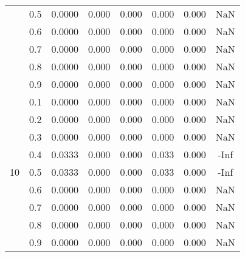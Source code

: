 \documentclass[11pt,a4paper]{report}
\begin{document}
\begin{longtable}{ | c | c || c | c | c | c | c | c | }
 & 0.5 & 0.0000 & 0.000 & 0.000 & 0.000 & 0.000 & NaN \\
 & 0.6 & 0.0000 & 0.000 & 0.000 & 0.000 & 0.000 & NaN \\
 & 0.7 & 0.0000 & 0.000 & 0.000 & 0.000 & 0.000 & NaN \\
 & 0.8 & 0.0000 & 0.000 & 0.000 & 0.000 & 0.000 & NaN \\
 & 0.9 & 0.0000 & 0.000 & 0.000 & 0.000 & 0.000 & NaN \\
 \hline
\multirow{9}{*}{10} & 0.1 & 0.0000 & 0.000 & 0.000 & 0.000 & 0.000 & NaN \\
 & 0.2 & 0.0000 & 0.000 & 0.000 & 0.000 & 0.000 & NaN \\
 & 0.3 & 0.0000 & 0.000 & 0.000 & 0.000 & 0.000 & NaN \\
 & 0.4 & 0.0333 & 0.000 & 0.000 & 0.033 & 0.000 & -Inf \\
 & 0.5 & 0.0333 & 0.000 & 0.000 & 0.033 & 0.000 & -Inf \\
 & 0.6 & 0.0000 & 0.000 & 0.000 & 0.000 & 0.000 & NaN \\
 & 0.7 & 0.0000 & 0.000 & 0.000 & 0.000 & 0.000 & NaN \\
 & 0.8 & 0.0000 & 0.000 & 0.000 & 0.000 & 0.000 & NaN \\
 & 0.9 & 0.0000 & 0.000 & 0.000 & 0.000 & 0.000 & NaN \\
 \hline
\hline
\end{longtable}
\end{document}
